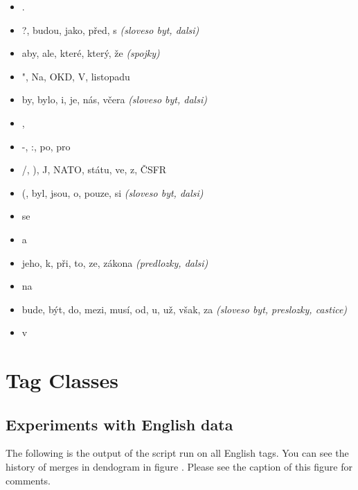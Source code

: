 \documentclass[12pt,a4paper]{article}
\begin{document}
\begin{itemize}
  \item .
  \item ?, budou, jako, před, s \textit{(sloveso byt, dalsi)}
  \item aby, ale, které, který, že \textit{(spojky)}
  \item ", Na, OKD, V, listopadu
  \item by, bylo, i, je, nás, včera \textit{(sloveso byt, dalsi)}
  \item ,
  \item -, :, po, pro
  \item /, ), J, NATO, státu, ve, z, ČSFR
  \item (, byl, jsou, o, pouze, si \textit{(sloveso byt, dalsi)}
  \item se
  \item a
  \item jeho, k, při, to, ze, zákona \textit{(predlozky, dalsi)}
  \item na
  \item bude, být, do, mezi, musí, od, u, už, však, za \textit{(sloveso byt, preslozky, castice)}
  \item v
\end{itemize}

\section{Tag Classes}

\subsection{Experiments with English data}

The following is the output of the script run on all English tags. You can see
the history of merges in dendogram in figure \label{dendrogram_en_tags}. Please
see the caption of this figure for comments.
\end{document}
